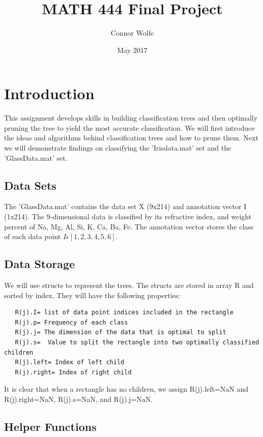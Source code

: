 \documentclass{article}
\title{MATH 444 Final Project}
\author{Connor Wolfe}
\date{May 2017}
\begin{document}
\maketitle

\section*{Introduction}
This assignment develops skills in building classification trees and then optimally pruning the tree to yield the most accurate classification.  We will first introduce the ideas and algorithms behind classification trees and how to prune them.  Next we will demonstrate findings on classifying the 'Irisdata.mat' set and the 'GlassData.mat' set.

\subsection*{Data Sets}
The 'GlassData.mat' contains the data set X (9x214) and annotation vector I (1x214).  The 9-dimensional data is classified by its refractive index, and weight percent of Na, Mg, Al, Si, K, Ca, Ba, Fe.  The annotation vector stores the class of each data point $I \epsilon [1, 2, 3, 4, 5, 6]$.  

\subsection*{Data Storage}
We will use structs to represent the trees.  The structs are stored in array R and sorted by index.  They will have the following properties:
\begin{verbatim}
   R(j).I= list of data point indices included in the rectangle 
   R(j).p= Frequency of each class
   R(j).j= The dimension of the data that is optimal to split
   R(j).s=  Value to split the rectangle into two optimally classified children 
   R(j).left= Index of left child
   R(j).right= Index of right child
\end{verbatim}
It is clear that when a rectangle has no children, we assign R(j).left=NaN and R(j).right=NaN, R(j).s=NaN, and R(j).j=NaN.  

\subsection*{Helper Functions}
\end{document}
